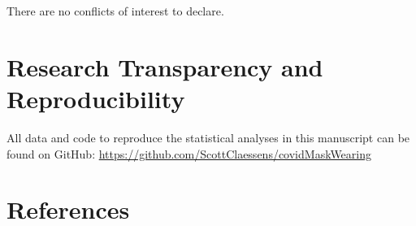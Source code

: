 \documentclass[
  english,
  man,floatsintext]{apa6}
\begin{document}
There are no conflicts of interest to declare.

\hypertarget{research-transparency-and-reproducibility}{%
\section{Research Transparency and Reproducibility}\label{research-transparency-and-reproducibility}}

All data and code to reproduce the statistical analyses in this manuscript can be found on GitHub: \url{https://github.com/ScottClaessens/covidMaskWearing}

\newpage

\hypertarget{references}{%
\section{References}\label{references}}

\begingroup
\setlength{\parindent}{-1in}
\setlength{\leftskip}{0.5in}
\end{document}
